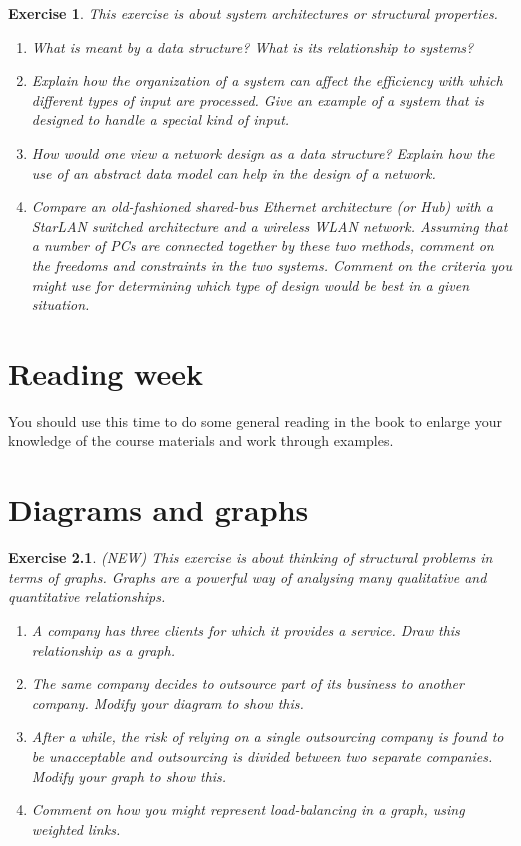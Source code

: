 \documentclass{book}
\newtheorem{exercise}{Exercise}
\begin{document}
\begin{exercise} 
This exercise is about system architectures or structural properties.
\begin{enumerate}
\item What is meant by a data structure? What is its relationship to systems?
\item Explain how the organization of a system can affect the
efficiency with which different types of input are processed. Give
an example of a system that is designed to handle a special kind of
input.
\item How would one view a network design as a data structure? Explain how the use of
an abstract data model can help in the design of a network.

\item Compare an old-fashioned shared-bus Ethernet architecture (or Hub) with a StarLAN switched
architecture and a wireless WLAN network. Assuming that a number of
PCs are connected together by these two methods, comment on the
freedoms and constraints in the two systems. Comment on the criteria
you might use for determining which type of design would be best in a
given situation.
\end{enumerate}
\end{exercise}
\begin{solution}
\end{solution}


\chapter{Reading week}

You should use this time to do some general reading in the book to
enlarge your knowledge of the course materials and work through
examples.

\chapter{Diagrams and graphs}


\begin{exercise} 
(NEW) This exercise is about thinking of structural problems in terms
of graphs. Graphs are a powerful way of analysing many qualitative and
quantitative relationships.
\begin{enumerate}
\item A company has three clients for which it provides a service. Draw this relationship as a graph.
\item The same company decides to outsource part of its business to another company. Modify your diagram to show this.
\item After a while, the risk of relying on a single outsourcing company is found to be unacceptable and outsourcing is divided between two separate companies. Modify your graph to show this.
\item Comment on how you might represent load-balancing in a graph, using weighted links. 
\end{enumerate}
\end{exercise}
\begin{solution}
\end{solution}
\end{document}
